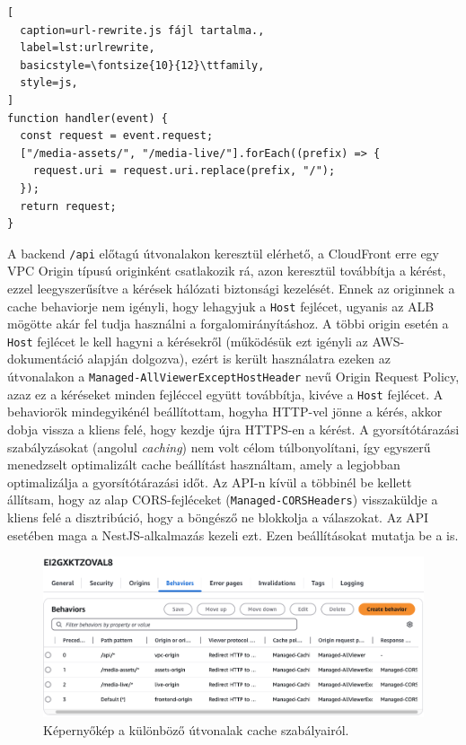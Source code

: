 \begin{minipage}{0.92\textwidth}
  \begin{lstlisting}[
  caption=url-rewrite.js fájl tartalma.,
  label=lst:urlrewrite,
  basicstyle=\fontsize{10}{12}\ttfamily,
  style=js,
]
function handler(event) {
  const request = event.request;
  ["/media-assets/", "/media-live/"].forEach((prefix) => {
    request.uri = request.uri.replace(prefix, "/");
  });
  return request;
}
\end{lstlisting}
\end{minipage}

A backend \verb|/api| előtagú útvonalakon keresztül elérhető, a CloudFront erre egy VPC Origin típusú originként csatlakozik rá, azon keresztül továbbítja a kérést, ezzel leegyszerűsítve a kérések hálózati biztonsági kezelését. Ennek az originnek a cache behaviorje nem igényli, hogy lehagyjuk a \verb|Host| fejlécet, ugyanis az ALB mögötte akár fel tudja használni a forgalomirányításhoz. A többi origin esetén a \verb|Host| fejlécet le kell hagyni a kérésekről (működésük ezt igényli az AWS-dokumentáció alapján dolgozva), ezért is került használatra ezeken az útvonalakon a \verb|Managed-AllViewerExceptHostHeader| nevű Origin Request Policy, azaz ez a kéréseket minden fejléccel együtt továbbítja, kivéve a \verb|Host| fejlécet. A behaviorök mindegyikénél beállítottam, hogyha HTTP-vel jönne a kérés, akkor dobja vissza a kliens felé, hogy kezdje újra HTTPS-en a kérést. A gyorsítótárazási szabályzásokat (angolul \emph{caching}) nem volt célom túlbonyolítani, így egyszerű menedzselt optimalizált cache beállítást használtam, amely a legjobban optimalizálja a gyorsítótárazási időt. Az API-n kívül a többinél be kellett állítsam, hogy az alap CORS-fejléceket (\verb|Managed-CORSHeaders|) visszaküldje a kliens felé a disztribúció, hogy a böngésző ne blokkolja a válaszokat. Az API esetében maga a NestJS-alkalmazás kezeli ezt. Ezen beállításokat mutatja be a  is.

\begin{figure}[h]
  \centering
  \includegraphics[width=150mm, keepaspectratio]{figures/distro_behav.png}
  \caption{Képernyőkép a különböző útvonalak cache szabályairól.}
  \label{fig:behav}
\end{figure}

